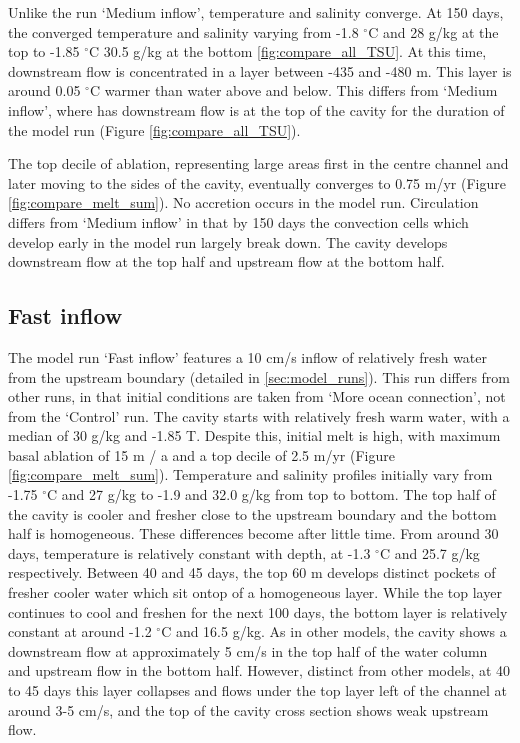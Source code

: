 Unlike the run `Medium inflow', temperature and salinity converge. At 150 days, the converged temperature and salinity varying from -1.8 $^{\circ}$C and 28  g/kg at the top to -1.85 $^{\circ}$C 30.5  g/kg at the bottom \ref{fig:compare_all_TSU}. At this time, downstream flow is concentrated in a layer between -435 and -480 m. This layer is around 0.05 $^{\circ}$C warmer than water above and below. This differs from `Medium inflow', where has downstream flow is at the top of the cavity for the duration of the model run (Figure \ref{fig:compare_all_TSU}). 

The top decile of ablation, representing large areas first in the centre channel and later moving to the sides of the cavity, eventually converges to 0.75 m/yr (Figure \ref{fig:compare_melt_sum}). No accretion occurs in the model run.
Circulation differs from `Medium inflow' in that by 150 days the convection cells which develop early in the model run largely break down. The cavity develops downstream flow at the top half and upstream flow at the bottom half.

\subsection{Fast inflow} \label{sec:high_velocity}

The model run `Fast inflow' features a 10 cm/s inflow of relatively fresh water from the upstream boundary (detailed in \ref{sec:model_runs}). This run differs from other runs, in that initial conditions are taken from `More ocean connection', not from the `Control' run. The cavity starts with relatively fresh warm water, with a median of 30  g/kg and -1.85 T.  Despite this, initial melt is high, with maximum basal ablation of 15 m / a and a top decile of 2.5 m/yr (Figure \ref{fig:compare_melt_sum}). Temperature and salinity profiles initially vary from -1.75 $^{\circ}$C and 27  g/kg to -1.9 and 32.0  g/kg from top to bottom. The top half of the cavity is cooler and fresher close to the upstream boundary and the bottom half is homogeneous. These differences become after little time. From around 30 days, temperature is relatively constant with depth, at -1.3 $^{\circ}$C and 25.7  g/kg respectively. Between 40 and 45 days, the top 60 m develops distinct pockets of fresher cooler water which sit ontop of a homogeneous layer. While the top layer continues to cool and freshen for the next 100 days, the bottom layer is relatively constant at around -1.2 $^{\circ}$C and 16.5 g/kg. As in other models, the cavity shows a  downstream flow at approximately 5 cm/s in the top half of the water column and upstream flow in the bottom half. However, distinct from other models, at 40 to 45 days this layer collapses and flows under the top layer left of the channel at around 3-5 cm/s, and the top of the cavity cross section shows weak upstream flow.  

